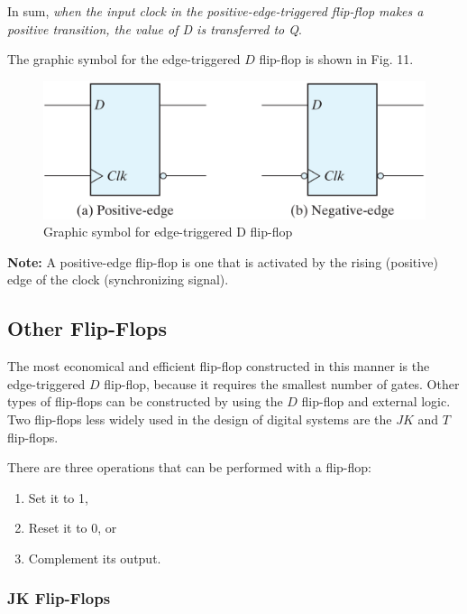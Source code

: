 In sum, \textit{when the input clock in the positive-edge-triggered flip-flop makes a positive transition, the value of \textnormal{D} is transferred to \textnormal{Q}}.

The graphic symbol for the edge-triggered $D$ flip-flop is shown in Fig. 11.
\begin{figure}[H]
  \centering
  \includegraphics[width=\linewidth]{img/fig-5.11.png}
  \caption{Graphic symbol for edge-triggered D flip-flop}
  \label{fig:5.11}
\end{figure}

\textbf{Note:} A positive-edge flip-flop is one that is activated by the rising (positive) edge of the clock (synchronizing signal).

\subsection{Other Flip-Flops}
\label{subsec:other-flip-flops}

The most economical and efficient flip-flop constructed in this manner is the edge-triggered $D$ flip-flop, because it requires the smallest number of gates. Other types of flip-flops can be constructed by using the $D$ flip-flop and external logic. Two flip-flops less widely used in the design of digital systems are the $JK$ and $T$ flip-flops.

There are three operations that can be performed with a flip-flop:
\begin{enumerate}[]
  \item Set it to 1,
  \item Reset it to 0, or 
  \item Complement its output.
\noindent \end{enumerate}

\subsubsection{JK Flip-Flops}
\label{subsubsec:jk-flip-flops}

